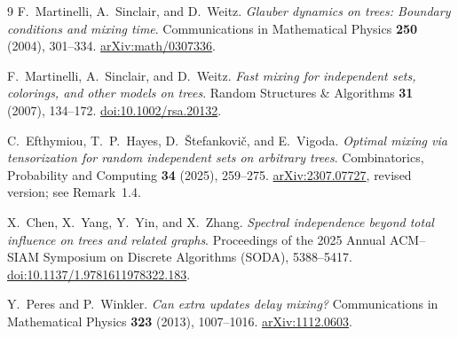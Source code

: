 \documentclass[11pt]{article}
\begin{document}
\begin{thebibliography}{9}
F.~Martinelli, A.~Sinclair, and D.~Weitz.
\emph{Glauber dynamics on trees: Boundary conditions and mixing time}.
Communications in Mathematical Physics \textbf{250} (2004), 301--334.
\href{https://arxiv.org/abs/math/0307336}{arXiv:math/0307336}.

F.~Martinelli, A.~Sinclair, and D.~Weitz.
\emph{Fast mixing for independent sets, colorings, and other models on trees}.
Random Structures \& Algorithms \textbf{31} (2007), 134--172.
\href{https://doi.org/10.1002/rsa.20132}{doi:10.1002/rsa.20132}.

C.~Efthymiou, T.~P.~Hayes, D.~\v{S}tefankovi\v{c}, and E.~Vigoda.
\emph{Optimal mixing via tensorization for random independent sets on arbitrary trees}.
Combinatorics, Probability and Computing \textbf{34} (2025), 259--275.
\href{https://arxiv.org/abs/2307.07727}{arXiv:2307.07727}, revised version; see Remark~1.4.

X.~Chen, X.~Yang, Y.~Yin, and X.~Zhang.
\emph{Spectral independence beyond total influence on trees and related graphs}.
Proceedings of the 2025 Annual ACM--SIAM Symposium on Discrete Algorithms (SODA), 5388--5417.
\href{https://doi.org/10.1137/1.9781611978322.183}{doi:10.1137/1.9781611978322.183}.

Y.~Peres and P.~Winkler.
\emph{Can extra updates delay mixing?}
Communications in Mathematical Physics \textbf{323} (2013), 1007--1016.
\href{https://arxiv.org/abs/1112.0603}{arXiv:1112.0603}.
\end{thebibliography}
\end{document}
